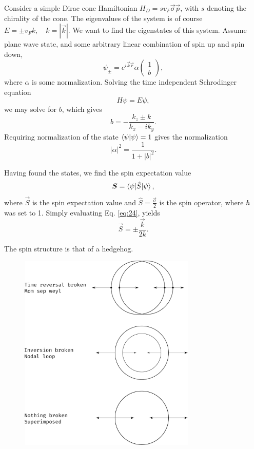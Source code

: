 Consider a simple Dirac cone Hamiltonian \(H_{D} = s v_{F} \vec{\sigma} \vec{p}\), with \(s\) denoting the chirality of the cone.
The eigenvalues of the system is of course \(E = \pm v_{F} k, \quad k=|\vec{k}|\).
We want to find the eigenstates of this system.
Assume plane wave state, and some arbitrary linear combination of spin up and spin down,
\[
  \psi _{\pm} = e^{i \vec{k} \vec{r}} \alpha
  \begin{pmatrix}
    1\\
    b
  \end{pmatrix},
\]
where \(\alpha \) is some normalization.
Solving the time independent Schrodinger equation
\[
H \psi = E \psi,
\]
we may solve for \(b\), which gives
\begin{equation}
  \label{eq:23}
  b = -\frac{k_{z} \pm k}{k_{x} - i k_{y}}.
\end{equation}
Requiring normalization of the state \(\braket{\psi | \psi } = 1\) gives the normalization
\[
|\alpha |^2 = \frac{1}{1 + |b|^2}.
\]

Having found the states, we find the spin expectation value
\begin{equation}
  \label{eq:24}
  \bm{S} = \braket{\psi | \hat{S} | \psi },
\end{equation}
where \(\vec{S}\) is the spin expectation value and \(\hat{S} = \frac{\vec{\sigma}}{2} \) is the spin operator, where \(\hbar \) was set to 1.
Simply evaluating Eq. \eqref{eq:24}, yields
\begin{equation}
  \label{eq:25}
  \vec{S} = \pm \frac{\vec{k}}{2 k}.
\end{equation}

The spin structure is that of a hedgehog.

\begin{figure}[ht]
  \centering
  \includegraphics[width=0.75\textwidth]{figures/spinStructureWeyl}
  \caption{\label{fig:spinStructure} }
\end{figure}



